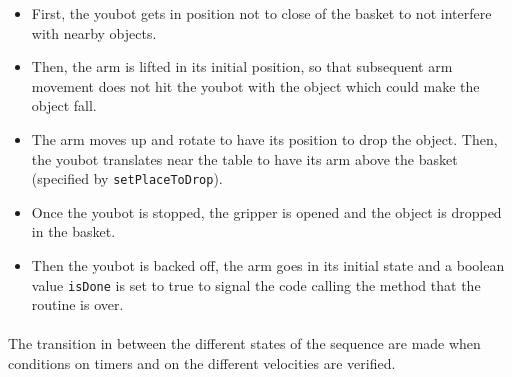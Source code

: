 \documentclass[12pt,a4paper]{article}
\begin{document}
\begin{itemize}
\item First, the youbot gets in position not to close of the basket to not interfere with nearby objects.

\item Then, the arm is lifted in its initial position, so that subsequent arm movement does not hit the youbot with the object which could make the object fall.

\item The arm moves up and rotate to have its position to drop the object. Then, the youbot translates near the table to have its arm above the basket (specified by \texttt{setPlaceToDrop}).

\item Once the youbot is stopped, the gripper is opened and the object is dropped in the basket.

\item Then the youbot is backed off, the arm goes in its initial state and a boolean value \texttt{isDone} is set to true to signal the code calling the method that the routine is over.
\end{itemize}

\paragraph{} The transition in between the different states of the sequence are made when conditions on timers and on the different velocities are verified.




\end{document}
